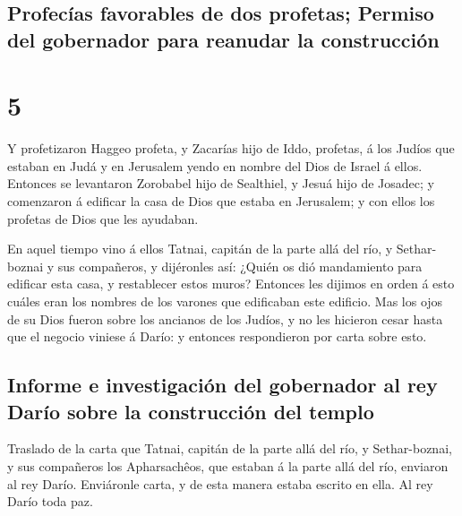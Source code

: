 \hypertarget{profecuxedas-favorables-de-dos-profetas-permiso-del-gobernador-para-reanudar-la-construcciuxf3n}{%
\subsection{Profecías favorables de dos profetas; Permiso del gobernador
para reanudar la
construcción}\label{profecuxedas-favorables-de-dos-profetas-permiso-del-gobernador-para-reanudar-la-construcciuxf3n}}

\hypertarget{section-4}{%
\section{5}\label{section-4}}

 Y profetizaron Haggeo profeta, y Zacarías hijo de Iddo,
profetas, á los Judíos que estaban en Judá y en Jerusalem yendo en
nombre del Dios de Israel á ellos.  Entonces se levantaron
Zorobabel hijo de Sealthiel, y Jesuá hijo de Josadec; y comenzaron á
edificar la casa de Dios que estaba en Jerusalem; y con ellos los
profetas de Dios que les ayudaban.

 En aquel tiempo vino á ellos Tatnai, capitán de la parte
allá del río, y Sethar-boznai y sus compañeros, y dijéronles así: ¿Quién
os dió mandamiento para edificar esta casa, y restablecer estos muros?
 Entonces les dijimos en orden á esto cuáles eran los
nombres de los varones que edificaban este edificio.  Mas
los ojos de su Dios fueron sobre los ancianos de los Judíos, y no les
hicieron cesar hasta que el negocio viniese á Darío: y entonces
respondieron por carta sobre esto.

\hypertarget{informe-e-investigaciuxf3n-del-gobernador-al-rey-daruxedo-sobre-la-construcciuxf3n-del-templo}{%
\subsection{Informe e investigación del gobernador al rey Darío sobre la
construcción del
templo}\label{informe-e-investigaciuxf3n-del-gobernador-al-rey-daruxedo-sobre-la-construcciuxf3n-del-templo}}

 Traslado de la carta que Tatnai, capitán de la parte allá
del río, y Sethar-boznai, y sus compañeros los Apharsachêos, que estaban
á la parte allá del río, enviaron al rey Darío.  Enviáronle
carta, y de esta manera estaba escrito en ella. Al rey Darío toda paz.

